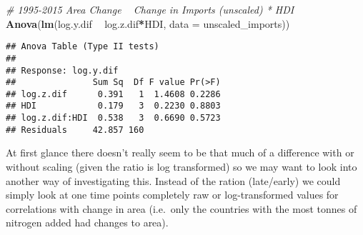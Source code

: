 \documentclass[
]{article}
\newenvironment{Shaded}{\begin{snugshade}}{\end{snugshade}}
\newcommand{\CommentTok}[1]{\textcolor[rgb]{0.56,0.35,0.01}{\textit{#1}}}
\newcommand{\DataTypeTok}[1]{\textcolor[rgb]{0.13,0.29,0.53}{#1}}
\newcommand{\KeywordTok}[1]{\textcolor[rgb]{0.13,0.29,0.53}{\textbf{#1}}}
\newcommand{\NormalTok}[1]{#1}
\newcommand{\OperatorTok}[1]{\textcolor[rgb]{0.81,0.36,0.00}{\textbf{#1}}}
\newcommand{\StringTok}[1]{\textcolor[rgb]{0.31,0.60,0.02}{#1}}
\begin{document}
\begin{Shaded}
\begin{Highlighting}[]
\CommentTok{# 1995-2015 Area Change ~ Change in Imports (unscaled) * HDI}
\KeywordTok{Anova}\NormalTok{(}\KeywordTok{lm}\NormalTok{(log.y.dif }\OperatorTok{~}\StringTok{ }\NormalTok{log.z.dif}\OperatorTok{*}\NormalTok{HDI, }\DataTypeTok{data =}\NormalTok{ unscaled_imports))}
\end{Highlighting}
\end{Shaded}

\begin{verbatim}
## Anova Table (Type II tests)
## 
## Response: log.y.dif
##               Sum Sq  Df F value Pr(>F)
## log.z.dif      0.391   1  1.4608 0.2286
## HDI            0.179   3  0.2230 0.8803
## log.z.dif:HDI  0.538   3  0.6690 0.5723
## Residuals     42.857 160
\end{verbatim}

At first glance there doesn't really seem to be that much of a
difference with or without scaling (given the ratio is log transformed)
so we may want to look into another way of investigating this. Instead
of the ration (late/early) we could simply look at one time points
completely raw or log-transformed values for correlations with change in
area (i.e.~only the countries with the most tonnes of nitrogen added had
changes to area).
\end{document}
